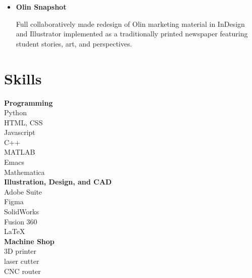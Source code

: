 \documentclass[10pt]{article} %
\begin{document}
\begin{minipage}[t]{0.8\textwidth}
\begin{itemize} [noitemsep,topsep=0pt]
  Developed a full-stack web app in a team with Vue, Python, and MariaDB that coordinates student schedules, pulling information from Google Calendar services and optimizing possible meeting times in a multi-user system.
  \item {}\textbf{Olin Snapshot }

  Full collaboratively made redesign of Olin marketing material in InDesign and Illustrator implemented as a traditionally printed newspaper featuring student stories, art, and perspectives.
  \\
\end{itemize}
\end{minipage}
\hspace{0.5cm}
\begin{minipage}[t]{0.2\textwidth}
 \section*{Skills}
\textbf{Programming}\\
Python\\
HTML, CSS\\
Javascript\\
C++\\
MATLAB\\
Emacs\\
Mathematica\\

\textbf{Illustration, Design, and CAD}\\
Adobe Suite\\
Figma\\
SolidWorks\\
Fusion 360\\
LaTeX\\
\textbf{Machine Shop}\\
3D printer\\ laser cutter\\ CNC router\\
\end{minipage}
\end{document}
